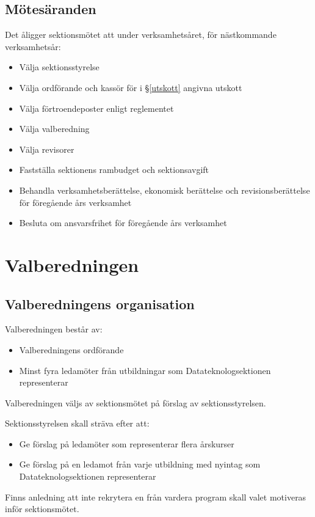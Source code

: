 \documentclass{datateknologsektionen-document}
\begin{document}
\subsection{Mötesäranden}
Det åligger sektionsmötet att under verksamhetsåret, för nästkommande verksamhetsår:
\begin{itemize}
  \item Välja sektionsstyrelse
  \item Välja ordförande och kassör för i \S \ref{utskott} angivna utskott
  \item Välja förtroendeposter enligt reglementet
  \item Välja valberedning
  \item Välja revisorer
  \item Fastställa sektionens rambudget och sektionsavgift
  \item Behandla verksamhetsberättelse, ekonomisk berättelse och revisionsberättelse för föregående års verksamhet
  \item Besluta om ansvarsfrihet för föregående års verksamhet
\end{itemize}


\section{Valberedningen}
\subsection{Valberedningens organisation}
Valberedningen består av:
\begin{itemize}
  \item Valberedningens ordförande
  \item Minst fyra ledamöter från utbildningar som Datateknologsektionen representerar
\end{itemize}

Valberedningen väljs av sektionsmötet på förslag av sektionsstyrelsen.

Sektionsstyrelsen skall sträva efter att:
\begin{itemize}
  \item Ge förslag på ledamöter som representerar flera årskurser
  \item Ge förslag på en ledamot från varje utbildning med nyintag som Datateknologsektionen representerar
\end{itemize}

Finns anledning att inte rekrytera en från vardera program skall valet motiveras inför sektionsmötet.
\end{document}
